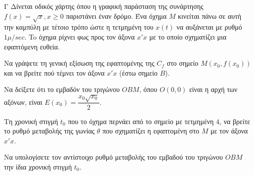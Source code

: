 \begin{thema}{Γ}
Δίνεται οδικός χάρτης όπου η γραφική παράσταση της συνάρτησης $f(x) = \sqrt{x}, x \ge 0$ παριστάνει έναν δρόμο. Ένα όχημα $M$ κινείται πάνω σε αυτή την καμπύλη με τέτοιο τρόπο ώστε η τετμημένη του $x(t)$ να αυξάνεται με ρυθμό $1 \mu/\si{sec}$. To όχημα ρίχνει φως προς τον άξονα $x'x$ με το οποίο σχηματίζει μια εφαπτόμενη ευθεία.
\begin{erwthma}
  \item Να γράψετε τη γενική εξίσωση της εφαπτομένης της $C_f$ στο σημείο $M(x_0, f(x_0))$ και να βρείτε πού τέμνει τον άξονα $x'x$ (έστω σημείο $B$).
  \item Να δείξετε ότι το εμβαδόν του τριγώνου $O B M$, όπου $O(0,0)$ είναι η αρχή των αξόνων, είναι $E(x_0) = \dfrac{x_0\sqrt{x_0}}{2}$.
  \item Τη χρονική στιγμή $t_0$ που το όχημα περνάει από το σημείο με τετμημένη $4$, να βρείτε το ρυθμό μεταβολής της γωνίας $\theta$ που σχηματίζει η εφαπτομένη στο $M$ με τον άξονα $x'x$.
  \item Να υπολογίσετε τον αντίστοιχο ρυθμό μεταβολής του εμβαδού του τριγώνου $O B M$ την ίδια χρονική στιγμή $t_0$.
\end{erwthma}
\end{thema}
